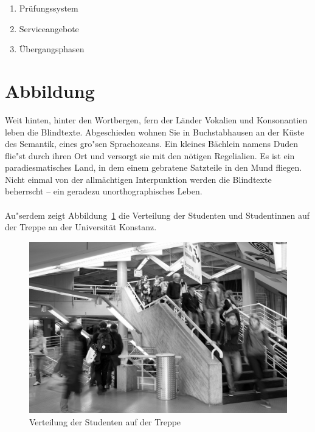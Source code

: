 \documentclass[../thesis.tex]{subfiles}
\begin{document}
\begin{enumerate}
\item Prüfungssystem
\item Serviceangebote
\item Übergangsphasen

\end{enumerate}





\section{Abbildung}

Weit hinten, hinter den Wortbergen, fern der Länder Vokalien und Konsonantien leben die Blindtexte. Abgeschieden wohnen Sie in Buchstabhausen an der Küste des Semantik, eines gro"sen Sprachozeans. Ein kleines Bächlein namens Duden flie"st durch ihren Ort und versorgt sie mit den nötigen Regelialien. Es ist ein paradiesmatisches Land, in dem einem gebratene Satzteile in den Mund fliegen. Nicht einmal von der allmächtigen Interpunktion werden die Blindtexte beherrscht – ein geradezu unorthographisches Leben.\\
\\
Au"serdem zeigt Abbildung~\ref{fig:treppe} die Verteilung der Studenten und Studentinnen auf der Treppe an der Universität Konstanz.
\begin{figure}[H]
\includegraphics[width=\textwidth]{graphics/indoor_sw.png}
\caption{Verteilung der Studenten auf der Treppe}
\label{fig:treppe}
\end{figure}
\end{document}
